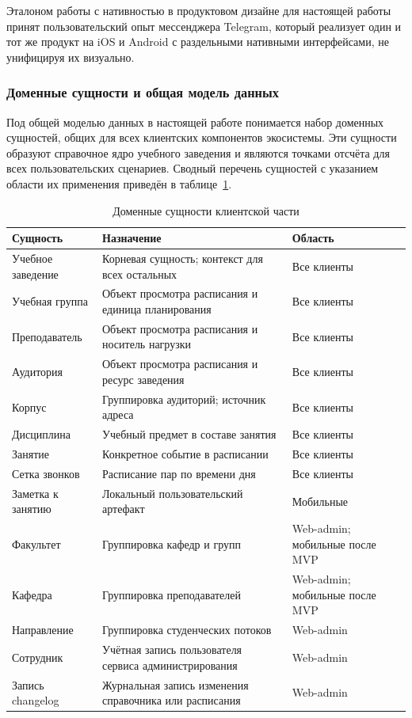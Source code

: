 Эталоном работы с нативностью в продуктовом дизайне для настоящей работы принят пользовательский опыт мессенджера Telegram, который реализует один и тот же продукт на iOS и Android с раздельными нативными интерфейсами, не унифицируя их визуально.

\subsubsection{Доменные сущности и общая модель данных}
\label{subsubsec:domain-model}

Под общей моделью данных в настоящей работе понимается набор доменных сущностей, общих для всех клиентских компонентов экосистемы. Эти сущности образуют справочное ядро учебного заведения и являются точками отсчёта для всех пользовательских сценариев. Сводный перечень сущностей с указанием области их применения приведён в таблице~\ref{tab:domain-entities}.

\begin{table}[h]
  \caption{Доменные сущности клиентской части}
  \label{tab:domain-entities}
  \centering
  \small
  \begin{tabular}{p{} p{} p{}}
    \toprule
    Сущность & Назначение & Область \\
    \midrule
    Учебное заведение & Корневая сущность; контекст для всех остальных & Все клиенты \\
    Учебная группа    & Объект просмотра расписания и единица планирования & Все клиенты \\
    Преподаватель     & Объект просмотра расписания и носитель нагрузки    & Все клиенты \\
    Аудитория         & Объект просмотра расписания и ресурс заведения     & Все клиенты \\
    Корпус            & Группировка аудиторий; источник адреса             & Все клиенты \\
    Дисциплина        & Учебный предмет в составе занятия                  & Все клиенты \\
    Занятие           & Конкретное событие в расписании                    & Все клиенты \\
    Сетка звонков     & Расписание пар по времени дня                      & Все клиенты \\
    Заметка к занятию & Локальный пользовательский артефакт                & Мобильные \\
    Факультет         & Группировка кафедр и групп                         & Web-admin; мобильные после MVP \\
    Кафедра           & Группировка преподавателей                         & Web-admin; мобильные после MVP \\
    Направление       & Группировка студенческих потоков                   & Web-admin \\
    Сотрудник         & Учётная запись пользователя сервиса администрирования & Web-admin \\
    Запись changelog  & Журнальная запись изменения справочника или расписания & Web-admin \\
    \bottomrule
  \end{tabular}
\end{table}

